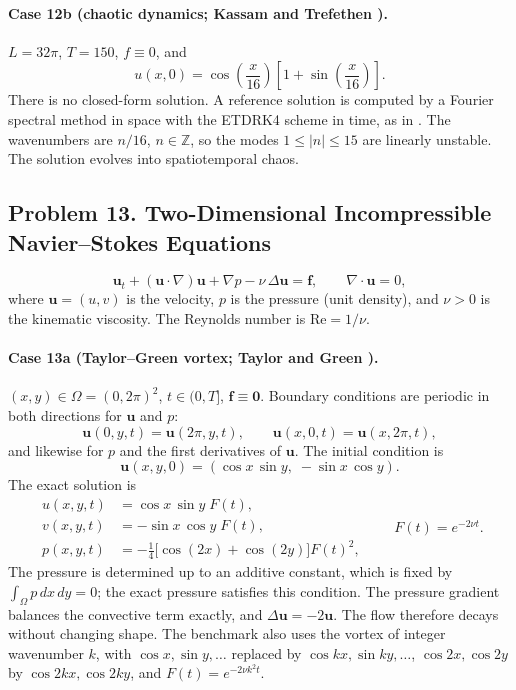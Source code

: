 \documentclass[11pt]{article}
\begin{document}
\paragraph{Case 12b (chaotic dynamics; Kassam and Trefethen \cite{KT05}).}
$L=32\pi$, $T=150$, $f\equiv0$, and
\[
u(x,0)=\cos\!\left(\frac{x}{16}\right)\left[1+\sin\!\left(\frac{x}{16}\right)\right].
\]
There is no closed-form solution. A reference solution is computed by a
Fourier spectral method in space with the ETDRK4 scheme in time, as in
\cite{KT05}. The wavenumbers are $n/16$, $n\in\mathbb{Z}$, so the
modes $1\le|n|\le15$ are linearly unstable. The solution evolves into
spatiotemporal chaos.

\subsection*{Problem 13. Two-Dimensional Incompressible Navier--Stokes Equations}

\[
\boxed{
\mathbf{u}_t+(\mathbf{u}\cdot\nabla)\mathbf{u}+\nabla p-\nu\,\Delta\mathbf{u}=\mathbf{f},
\qquad
\nabla\cdot\mathbf{u}=0
},
\]
where $\mathbf{u}=(u,v)$ is the velocity, $p$ is the pressure (unit
density), and $\nu>0$ is the kinematic viscosity. The Reynolds number is
$\mathrm{Re}=1/\nu$.

\paragraph{Case 13a (Taylor--Green vortex; Taylor and Green \cite{TG37}).}
$(x,y)\in\Omega=(0,2\pi)^2$, $t\in(0,T]$, $\mathbf{f}\equiv\mathbf{0}$.
Boundary conditions are periodic in both directions for $\mathbf{u}$ and $p$:
\[
\mathbf{u}(0,y,t)=\mathbf{u}(2\pi,y,t),\qquad
\mathbf{u}(x,0,t)=\mathbf{u}(x,2\pi,t),
\]
and likewise for $p$ and the first derivatives of $\mathbf{u}$. The
initial condition is
\[
\mathbf{u}(x,y,0)=(\cos x\,\sin y,\;-\sin x\,\cos y).
\]
The exact solution is
\[
\begin{aligned}
u(x,y,t)&=\cos x\,\sin y\;F(t),\\
v(x,y,t)&=-\sin x\,\cos y\;F(t),\\
p(x,y,t)&=-\frac14\bigl[\cos(2x)+\cos(2y)\bigr]F(t)^2,
\end{aligned}
\qquad F(t)=e^{-2\nu t}.
\]
The pressure is determined up to an additive constant, which is fixed by
$\int_\Omega p\,dx\,dy=0$; the exact pressure satisfies this condition.
The pressure gradient balances the convective term exactly, and
$\Delta\mathbf{u}=-2\mathbf{u}$. The flow therefore decays without
changing shape. The benchmark also uses the vortex of integer wavenumber
$k$, with $\cos x,\sin y,\ldots$ replaced by $\cos kx,\sin ky,\ldots$,
$\cos 2x,\cos 2y$ by $\cos 2kx,\cos 2ky$, and $F(t)=e^{-2\nu k^2t}$.
\end{document}
